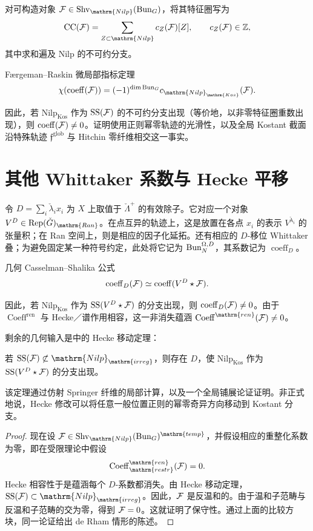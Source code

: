 对可构造对象 $\cF\in\Shv_{\mathrm{Nilp}}(\Bun_G)$，将其特征圈写为
\[\operatorname{CC}(\cF)=\sum_{Z\subset\mathrm{Nilp}}c_Z(\cF)[Z],\qquad c_Z(\cF)\in\mathbb Z,\]
其中求和遍及 $\mathrm{Nilp}$ 的不可约分支。
\begin{theorem*}{Færgeman–Raskin 微局部指标定理\cite{FR25}}
\[\chi(\operatorname{coeff}(\cF))=(-1)^{\dim\Bun_G}c_{\mathrm{Nilp}_{\mathrm{Kos}}}(\cF).\]
\end{theorem*}
因此，若 $\mathrm{Nilp}_{\mathrm{Kos}}$ 作为 $\operatorname{SS}(\mathcal{F})$ 的不可约分支出现（等价地，以非零特征圈重数出现），则 $\operatorname{coeff}(\mathcal{F})\ne0$。证明使用正则幂零轨迹的光滑性，以及全局 Kostant 截面沿特殊轨迹 $\mathfrak f^{\mathrm{glob}}$ 与 Hitchin 零纤维相交这一事实。

\newpage
\section{其他 Whittaker 系数与 Hecke 平移}\label{sec:13.6}
令 $D=\sum_i\check\lambda_i x_i$ 为 $X$ 上取值于 $\check\Lambda^+$ 的有效除子。它对应一个对象 $V^D\in\Rep(\checkG)_{\mathrm{Ran}}$。在点互异的轨迹上，这是放置在各点 $x_i$ 的表示 $V^{\check\lambda_i}$ 的张量积；在 Ran 空间上，则是相应的因子化延拓。还有相应的 $D$-移位 Whittaker 叠；为避免固定某一种符号约定，此处将它记为 $\operatorname{Bun}_N^{\Omega,D}$，其系数记为 $\operatorname{coeff}_D$。
\begin{theorem*}{几何 Casselman–Shalika 公式}
\[\operatorname{coeff}_D(\mathcal{F})\simeq\operatorname{coeff}(V^D\star\mathcal{F}).\]
\end{theorem*}
因此，若 $\mathrm{Nilp}_{\mathrm{Kos}}$ 作为 $\operatorname{SS}(V^D\star\mathcal{F})$ 的分支出现，则 $\operatorname{coeff}_D(\mathcal{F})\ne0$。由于 $\operatorname{Coeff}^{\mathrm{ren}}$ 与 Hecke／谱作用相容，这一非消失蕴涵 $\operatorname{Coeff}^{\mathrm{ren}}(\cF)\ne0$。

剩余的几何输入是\cite{FR25}中的 Hecke 移动定理：
\begin{theorem*}{}
若 $\operatorname{SS}(\cF)\not\subset\mathrm{Nilp}_{\mathrm{irreg}}$，则存在 $D$，使 $\mathrm{Nilp}_{\mathrm{Kos}}$ 作为 $\operatorname{SS}(V^D\star\mathcal{F})$ 的分支出现。
\end{theorem*}
该定理通过仿射 Springer 纤维的局部计算，以及一个全局铺展论证证明。非正式地说，Hecke 修改可以将任意一般位置正则的幂零奇异方向移动到 Kostant 分支。
\enlargethispage{\baselineskip}
\begin{proof}

现在设 $\cF\in\Shv_{\mathrm{Nilp}}(\Bun_G)^{\mathrm{temp}}$，并假设相应的重整化系数为零，即在受限理论中假设
\[\operatorname{Coeff}^{\mathrm{ren}}_{\mathrm{restr}}(\cF)=0.\]
Hecke 相容性于是蕴涵每个 $D$-系数都消失。由 Hecke 移动定理，$\operatorname{SS}(\cF)\subset\mathrm{Nilp}_{\mathrm{irreg}}$。因此，$\mathcal{F}$ 是反温和的。由于温和子范畴与反温和子范畴的交为零，得到 $\mathcal{F}=0$。这就证明了保守性。通过上面的比较方块，同一论证给出 de Rham 情形的陈述。
\end{proof}
